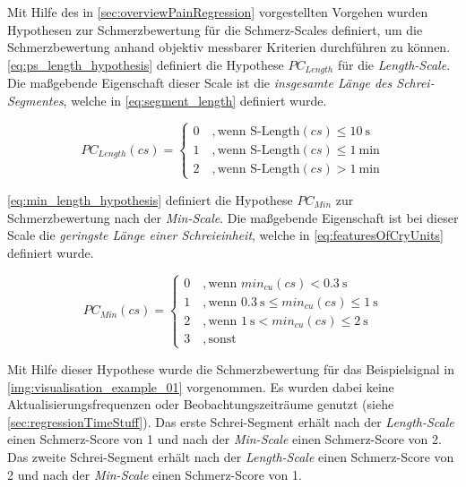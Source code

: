 Mit Hilfe des in \autoref{sec:overviewPainRegression} vorgestellten Vorgehen wurden Hypothesen zur Schmerzbewertung für die Schmerz-Scales definiert, um die Schmerzbewertung anhand objektiv messbarer Kriterien durchführen zu können. \autoref{eq:ps_length_hypothesis} definiert die Hypothese $PC_{Length}$ für die \emph{Length-Scale}. Die maßgebende Eigenschaft dieser Scale ist die \emph{insgesamte Länge des Schrei-Segmentes}, welche in \autoref{eq:segment_length} definiert wurde.

\begin{equation}
PC_{Length}(cs) = \begin{cases}
 0 \quad ,  \text{wenn } \text{S-Length}(cs) \leq \SI{10}{\second} \\
 1 \quad ,  \text{wenn } \text{S-Length}(cs) \leq \SI{1}{\minute} \\
 2 \quad ,  \text{wenn } \text{S-Length}(cs) > \SI{1}{\minute}
 \end{cases}	
 \label{eq:ps_length_hypothesis}
\end{equation}

\autoref{eq:min_length_hypothesis} definiert die Hypothese $PC_{Min}$ zur Schmerzbewertung nach der \emph{Min-Scale}. Die maßgebende Eigenschaft ist bei dieser Scale die \emph{geringste Länge einer Schreieinheit}, welche in \autoref{eq:featuresOfCryUnits} definiert wurde.

\begin{equation}
PC_{Min}(cs) = \begin{cases}
 0 \quad ,  \text{wenn } min_{cu}(cs) < \SI{0.3}{\second}\\
 1 \quad ,  \text{wenn } \SI{0.3}{\second} \leq min_{cu}(cs) \leq \SI{1}{\second}\\
 2 \quad ,  \text{wenn } \SI{1}{\second} < min_{cu}(cs) \leq \SI{2}{\second} \\
 3 \quad , \text{sonst }
 \end{cases}	
 \label{eq:min_length_hypothesis}
\end{equation}

Mit Hilfe dieser Hypothese wurde die Schmerzbewertung für das Beispielsignal in \autoref{img:visualisation_example_01} vorgenommen. Es wurden dabei keine Aktualisierungsfrequenzen oder Beobachtungszeiträume genutzt (siehe \autoref{sec:regressionTimeStuff}). Das erste Schrei-Segment erhält nach der \emph{Length-Scale} einen Schmerz-Score von 1 und nach der \emph{Min-Scale} einen Schmerz-Score von 2. Das zweite Schrei-Segment erhält nach der \emph{Length-Scale} einen Schmerz-Score von 2 und nach der \emph{Min-Scale} einen Schmerz-Score von 1.

